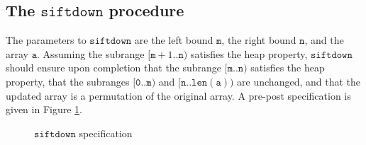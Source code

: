 \documentclass[english,submission]{eptcs}
\newcommand{\procedurelabel}[1]{\small \texttt{#1}}
\newcommand{\situationrule}{\vspace{-1.2ex}\mbox{}\rule[1.2ex]{\linewidth}{0.4pt}\mbox{}}
\newcommand{\procedurerule}{\situationrule}
\newcommand{\invariant}[1]{\small \ensuremath{\mathtt{#1}}}
\newcommand{\declaration}[1]{\small \ensuremath{\mathtt{#1}}}
\newcommand{\ibpid}[1]{\texttt{#1}}
\newcommand{\ibpkw}[1]{\textsf{\textbf{#1}}}
\begin{document}
\subsection{The $\texttt{siftdown}$ procedure}

The parameters to $\texttt{siftdown}$ are the left bound $\mathtt{m}$,
the right bound $\mathtt{n}$, and the array $\mathtt{a}$. Assuming
the subrange $[\mathtt{m}+1..\mathtt{n})$ satisfies the heap property,
$\texttt{siftdown}$ should ensure upon completion that the subrange
$[\mathtt{m}..\mathtt{n})$ satisfies the heap property, that the
subranges $[\mathtt{0}..\mathtt{m})$ and $[\mathtt{n}..\mathtt{len(a)})$
are unchanged, and that the updated array is a permutation of the
original array. A pre-post specification is given in Figure \ref{fig:Siftdown-spec}.
\begin{figure}
\noindent \begin{centering}
\par\end{centering}

\caption{$\texttt{siftdown}$ specification\label{fig:Siftdown-spec}}
\end{figure}
\end{document}

